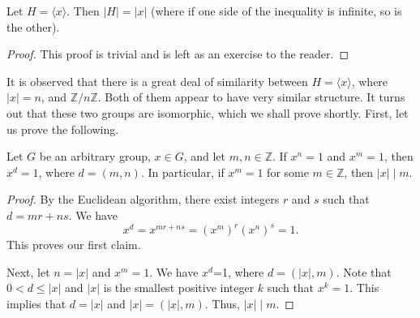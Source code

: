 \begin{theorem}
\label{orderOfCycGrpisOrderOfGen}
    Let $H=\langle x\rangle$. Then $|H|=|x|$ (where if one side of the inequality is infinite, so is the other).
\end{theorem}

\begin{proof}
    This proof is trivial and is left as an exercise to the reader.
\end{proof}

It is observed that there is a great deal of similarity between $H=\langle x\rangle$, where $|x|=n$, and $\mathbb{Z}/n\mathbb{Z}$. Both of them appear to have very similar structure. It turns out that these two groups are isomorphic, which we shall prove shortly. First, let us prove the following.

\begin{theorem}
\label{orderGCD}
    Let $G$ be an arbitrary group, $x\in G$, and let $m,n\in\mathbb{Z}$. If $x^n=1$ and $x^m=1$, then $x^d=1$, where $d=(m,n)$. In particular, if $x^m=1$ for some $m\in\mathbb{Z}$, then $|x|\mid m$.
\end{theorem}

\begin{proof}
    By the Euclidean algorithm, there exist integers $r$ and $s$ such that $d=mr+ns$. We have
    $$x^d=x^{mr+ns}=(x^m)^r(x^n)^s=1.$$
    This proves our first claim.
    
    Next, let $n=|x|$ and $x^m=1$. We have $x^d$=1, where $d=(|x|,m)$. Note that $0<d\leq |x|$ and $|x|$ is the smallest positive integer $k$ such that $x^k=1$. This implies that $d=|x|$ and $|x|=(|x|,m)$. Thus, $|x|\mid m$. 
\end{proof}

